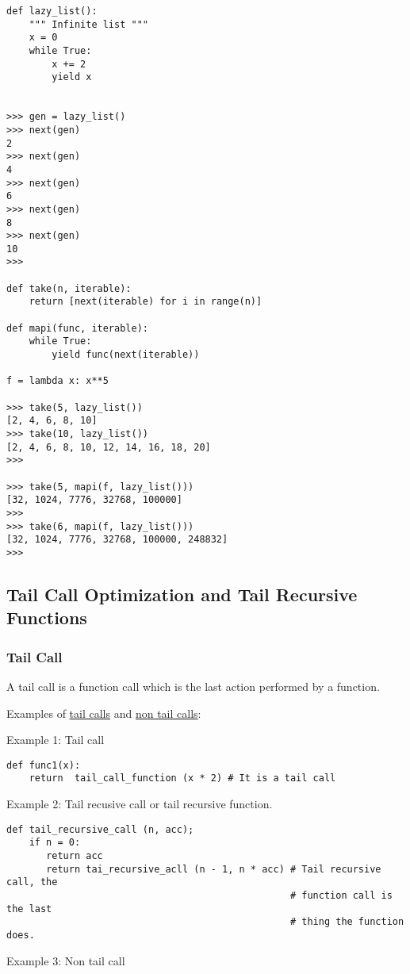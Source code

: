 \documentclass[11pt]{article}
\begin{document}
\begin{verbatim}
def lazy_list():
    """ Infinite list """
    x = 0 
    while True:
        x += 2
        yield x


>>> gen = lazy_list()
>>> next(gen)
2
>>> next(gen)
4
>>> next(gen)
6
>>> next(gen)
8
>>> next(gen)
10
>>> 

def take(n, iterable):
    return [next(iterable) for i in range(n)]

def mapi(func, iterable):   
    while True:
        yield func(next(iterable))
        
f = lambda x: x**5

>>> take(5, lazy_list())
[2, 4, 6, 8, 10]
>>> take(10, lazy_list())
[2, 4, 6, 8, 10, 12, 14, 16, 18, 20]
>>> 

>>> take(5, mapi(f, lazy_list()))
[32, 1024, 7776, 32768, 100000]
>>> 
>>> take(6, mapi(f, lazy_list()))
[32, 1024, 7776, 32768, 100000, 248832]
>>>
\end{verbatim}

\subsection{Tail Call Optimization and Tail Recursive Functions}
\label{sec-1-8}
\subsubsection{Tail Call}
\label{sec-1-8-1}

A tail call is a function call which is the last action performed by
a function.

Examples of \uline{tail calls} and \uline{non tail calls}: 

Example 1: Tail call 

\begin{verbatim}
def func1(x):
    return  tail_call_function (x * 2) # It is a tail call
\end{verbatim}


Example 2: Tail recusive call or tail recursive function. 

\begin{verbatim}
def tail_recursive_call (n, acc);
    if n = 0:
       return acc 
       return tai_recursive_acll (n - 1, n * acc) # Tail recursive call, the 
                                                  # function call is the last
                                                  # thing the function does.
\end{verbatim}

Example 3: Non tail call 
\end{document}
